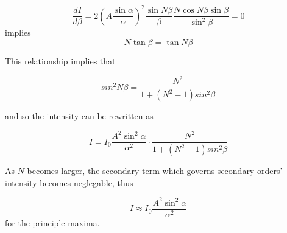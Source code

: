 \documentclass[12pt]{article}
\begin{document}
\[\frac{dI}{d\beta} = 2(A\frac{\sin{\alpha}}{\alpha})^{2}\frac{\sin{N\beta}}{\beta}\frac{N\cos{N\beta}\sin{\beta}}{\sin^{2}{\beta}}=0\]
implies
\[N\tan{\beta} = \tan{N\beta}\]

This relationship implies that

\[sin^{2}{N\beta} = \frac{N^{2}}{1 + (N^{2}-1)sin^{2}{\beta}}\]

and so the intensity can be rewritten as

\[I = I_{0}\frac{A^{2}\sin^{2}{\alpha}}{\alpha^{2}}\cdot \frac{N^{2}}{1 + (N^{2}-1)sin^{2}{\beta}}\]

As $N$ becomes larger, the secondary term which governs secondary orders' intensity becomes neglegable, thus

\[I \approx I_{0}\frac{A^{2}\sin^{2}{\alpha}}{\alpha^{2}}\] for the principle maxima.
\end{document}
